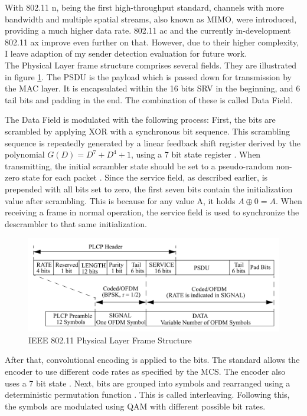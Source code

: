 With 802.11 n, being the first high-throughput standard, channels with more bandwidth and multiple spatial streams, also known as \gls{MIMO}, were introduced, providing a much higher data rate. 802.11 ac and the currently in-development 802.11 ax improve even further on that. However, due to their higher complexity, I leave adaption of my sender detection evaluation for future work.\\

The Physical Layer frame structure comprises several fields. They are illustrated in figure \ref{fig:phy-format}. The \gls{PSDU} is the payload which is passed down for transmission by the \gls{MAC} layer. It is encapsulated within the 16 bits \gls{SRV} in the beginning, and 6 tail bits and padding in the end. The combination of these is called Data Field.

The Data Field is modulated with the following process: First, the bits are scrambled by applying XOR with a synchronous bit sequence. This scrambling sequence is repeatedly generated by a linear feedback shift register derived by the polynomial $G(D)=D^7+D^4+1$, using a 7 bit state register \cite{ieee2012}. When transmitting, the initial scrambler state should be set to a pseudo-random non-zero state for each packet \cite{ieee2012}. Since the service field, as described earlier, is prepended with all bits set to zero, the first seven bits contain the initialization value after scrambling. This is because for any value A, it holds $A \oplus 0 = A$. When receiving a frame in normal operation, the service field is used to synchronize the descrambler to that same initialization.

\begin{figure}[H]
	\centering
	\includegraphics[width=\textwidth]{gfx/images/phy-format}
	\caption[IEEE 802.11 Physical Layer Frame Structure]{IEEE 802.11 Physical Layer Frame Structure \cite{ieee2012}}
	\label{fig:phy-format}
\end{figure}

After that, convolutional encoding is applied to the bits. The standard allows the encoder to use different code rates as specified by the \gls{MCS}. The encoder also uses a 7 bit state \cite{park2009}. Next, bits are grouped into symbols and rearranged using a deterministic permutation function \cite{perahia2013}. This is called interleaving. Following this, the symbols are modulated using \gls{QAM}	with different possible bit rates.\\

